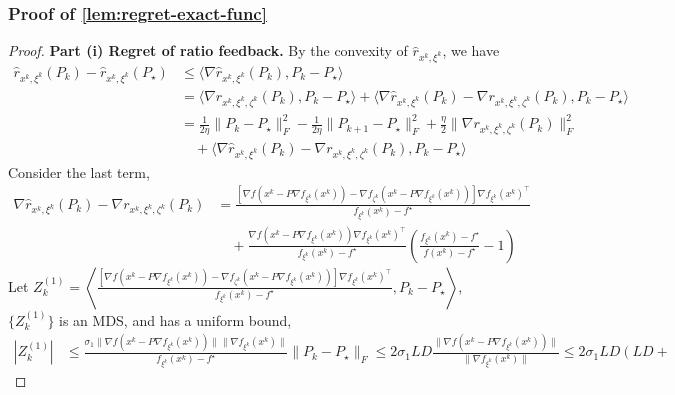 \documentclass{article}
\theoremstyle{definition}
\begin{document}
\subsubsection{Proof of \cref{lem:regret-exact-func}}
\begin{proof}
  \textbf{Part (i) Regret of ratio feedback.} By the convexity of $\hat{r}_{x^k, \xi^k}$, we have
  \begin{align}
    \hat{r}_{x^k, \xi^k} (P_k) - \hat{r}_{x^k, \xi^k} (P_{\star}) &{}\leq
    \langle \nabla \hat{r}_{x^k, \xi^k} (P_k), P_k - P_{\star} \rangle
    \nonumber\\
    &{}= \langle \nabla r_{x^k, \xi^k, \zeta^k} (P_k), P_k - P_{\star}
    \rangle + \langle \nabla \hat{r}_{x^k, \xi^k} (P_k) - \nabla r_{x^k,
    \xi^k, \zeta^k} (P_k), P_k - P_{\star} \rangle \nonumber\\
    &{}= \tfrac{1}{2 \eta} \| P_k - P_{\star} \|_F^2 - \tfrac{1}{2 \eta} \|
    P_{k + 1} - P_{\star} \|_F^2 + \tfrac{\eta}{2} \| \nabla r_{x^k, \xi^k,
    \zeta^k} (P_k) \|_F^2 \nonumber\\
    &{}\quad + \langle \nabla \hat{r}_{x^k, \xi^k} (P_k) - \nabla r_{x^k, \xi^k,
    \zeta^k} (P_k), P_k - P_{\star} \rangle \label{eq:regret-ratio-tel} 
  \end{align}
  Consider the last term,
  \begin{align*}
    \nabla \hat{r}_{x^k, \xi^k} (P_k) - \nabla r_{x^k, \xi^k, \zeta^k} (P_k) &{}= \tfrac{[\nabla f (x^k - P \nabla f_{\xi^k} (x^k)) - \nabla f_{\zeta^k}
    (x^k - P \nabla f_{\xi^k} (x^k))] \nabla f_{\xi^k} (x^k)^{\top}}{f_{\xi^k}
    (x^k) - f^{\star}}\\
    &{}\quad + \tfrac{\nabla f (x^k - P \nabla f_{\xi^k} (x^k)) \nabla f_{\xi^k}
    (x^k)^{\top}}{f_{\xi^k} (x^k) - f^{\star}} \left( \tfrac{f_{\xi^k} (x^k) -
    f^{\star}}{f (x^k) - f^{\star}} - 1 \right)
  \end{align*}
  Let $Z^{(1)}_k = \left\langle \tfrac{[\nabla f (x^k - P \nabla f_{\xi^k}
  (x^k)) - \nabla f_{\zeta^k} (x^k - P \nabla f_{\xi^k} (x^k))] \nabla
  f_{\xi^k} (x^k)^{\top}}{f_{\xi^k} (x^k) - f^{\star}}, P_k - P_{\star}
  \right\rangle$, $\{ Z^{(1)}_k \}$ is an MDS, and has a uniform bound,
  \begin{align*}
    | Z^{(1)}_k | &{}\leq \tfrac{\sigma_1 \| \nabla f (x^k - P \nabla
    f_{\xi^k} (x^k)) \| \| \nabla f_{\xi^k} (x^k) \|}{f_{\xi^k} (x^k) -
    f^{\star}} \| P_k - P_{\star} \|_F \leq 2 \sigma_1 L D \tfrac{\| \nabla f (x^k - P \nabla f_{\xi^k}
    (x^k)) \|}{\| \nabla f_{\xi^k} (x^k) \|} \leq 2 \sigma_1 L D \left( L D +

\end{align*}
\end{proof}
\end{document}
